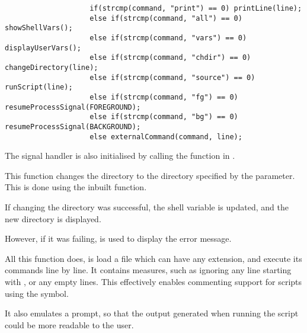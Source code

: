 \documentclass[12pt, a4paper]{report}
\begin{document}
                \begingroup
                \fontsize{10pt}{10pt}\selectfont
                \begin{verbatim}
                    if(strcmp(command, "print") == 0) printLine(line);
                    else if(strcmp(command, "all") == 0) showShellVars();
                    else if(strcmp(command, "vars") == 0) displayUserVars();
                    else if(strcmp(command, "chdir") == 0) changeDirectory(line); 
                    else if(strcmp(command, "source") == 0) runScript(line);
                    else if(strcmp(command, "fg") == 0) resumeProcessSignal(FOREGROUND);
                    else if(strcmp(command, "bg") == 0) resumeProcessSignal(BACKGROUND);
                    else externalCommand(command, line);
                \end{verbatim}
                \endgroup

                The signal handler is also initialised by calling the 
                function in .

                \clearpage
            
                This function changes the directory to the directory specified by
                the parameter. This is done using the inbuilt  function.

                If changing the directory was successful, the  shell
                variable is updated, and the new directory is displayed.

                However, if it was failing,  is used to display the
                error message.
            
                All this function does, is load a  file which can have
                any extension, and execute its commands line by line. It contains
                measures, such as ignoring any line starting with \tx{\#}, or 
                any empty lines. This effectively enables commenting support for 
                scripts using the \tx{\#} symbol.

                It also emulates a prompt, so that the output generated when running 
                the script could be more readable to the user.

                \clearpage
            
\end{document}
